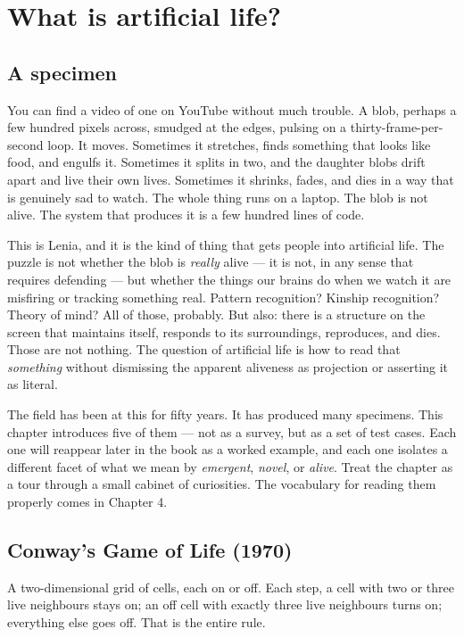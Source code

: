 \chapter{What is artificial life?}

\section{A specimen}

You can find a video of one on YouTube without much trouble. A blob,
perhaps a few hundred pixels across, smudged at the edges, pulsing on
a thirty-frame-per-second loop. It moves. Sometimes it stretches, finds
something that looks like food, and engulfs it. Sometimes it splits in
two, and the daughter blobs drift apart and live their own lives.
Sometimes it shrinks, fades, and dies in a way that is genuinely sad
to watch. The whole thing runs on a laptop. The blob is not alive. The
system that produces it is a few hundred lines of code.

This is Lenia, and it is the kind of thing that gets people into
artificial life. The puzzle is not whether the blob is \emph{really}
alive --- it is not, in any sense that requires defending --- but
whether the things our brains do when we watch it are misfiring or
tracking something real. Pattern recognition? Kinship recognition?
Theory of mind? All of those, probably. But also: there is a structure
on the screen that maintains itself, responds to its surroundings,
reproduces, and dies. Those are not nothing. The question of artificial
life is how to read that \emph{something} without dismissing the
apparent aliveness as projection or asserting it as literal.

The field has been at this for fifty years. It has produced many
specimens. This chapter introduces five of them --- not as a survey,
but as a set of test cases. Each one will reappear later in the book as
a worked example, and each one isolates a different facet of what we
mean by \emph{emergent}, \emph{novel}, or \emph{alive}. Treat the
chapter as a tour through a small cabinet of curiosities. The
vocabulary for reading them properly comes in Chapter 4.

\section{Conway's Game of Life (1970)}

A two-dimensional grid of cells, each on or off. Each step, a cell with
two or three live neighbours stays on; an off cell with exactly three
live neighbours turns on; everything else goes off. That is the entire
rule.

